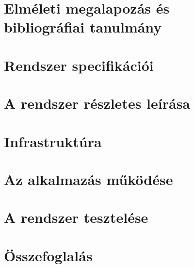 \documentclass[a4paper, 12pt, twoside]{report}
\begin{document}
\chapter{Elméleti megalapozás és bibliográfiai tanulmány}


\chapter{Rendszer specifikációi}


\chapter{A rendszer részletes leírása}


\chapter{Infrastruktúra}


\chapter{Az alkalmazás működése}


\chapter{A rendszer tesztelése}


\chapter{Összefoglalás}





%
\end{document}
